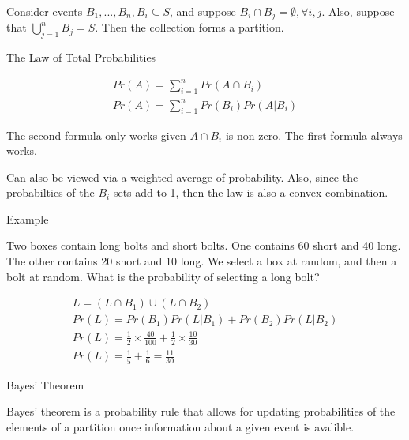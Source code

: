 \documentclass{report}
\begin{document}
\begin{description}
\begin{mdframed}
            Consider events $B_1,...,B_n, B_i \subseteq S$, and suppose
            $B_i \cap B_j = \emptyset, \forall i, j$. Also, suppose that
            $\bigcup_{j=1}^{n} B_j = S$. Then the collection forms a
            partition.

            \begin{center}
            \end{center}


            
            \begin{center}
            {\large The Law of Total Probabilities}
            \end{center}
            \begin{gather}
                Pr(A) = \sum_{i=1}^{n} Pr(A \cap B_i)\\
                Pr(A) = \sum_{i=1}^{n} Pr(B_i)Pr(A|B_i)
            \end{gather}

            The second formula only works given $A \cap B_i$ is
            non-zero. The first formula always works.

            Can also be viewed via a weighted average of probability.
            Also, since the probabilties of the $B_i$ sets add to
            1, then the law is also a convex combination.

        \end{mdframed}
    \item {\large Example}
        \begin{mdframed}
            Two boxes contain long bolts and short bolts. One
            contains 60 short and 40 long. The other contains
            20 short and 10 long. We select a box at random, and
            then a bolt at random. What is the probability of
            selecting a long bolt?

            \vspace{10}

            \begin{gather}
                L = (L \cap B_1) \cup (L \cap B_2)\\
                Pr(L) = Pr(B_1)Pr(L | B_1) + Pr(B_2)Pr(L | B_2)\\
                Pr(L) = \frac{1}{2} \times \frac{40}{100} + \frac{1}{2} \times \frac{10}{30}\\
                Pr(L) = \frac{1}{5} + \frac{1}{6} = \frac{11}{30}
            \end{gather}
        \end{mdframed}
    \item {\large Bayes' Theorem}
        \begin{mdframed}
            Bayes' theorem is a probability rule that allows for
            updating probabilities of the elements of a partition
            once information about a given event is avalible.


\end{mdframed}
\end{description}
\end{document}
